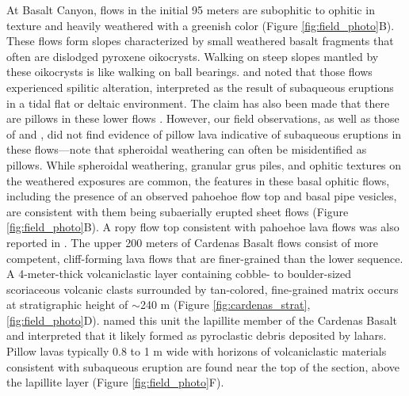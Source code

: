 \documentclass[draft]{agujournal2019}
\begin{document}
At Basalt Canyon, flows in the initial 95 meters are subophitic to ophitic in texture and heavily weathered with a greenish color (Figure \ref{fig:field_photo}B). These flows form slopes characterized by small weathered basalt fragments that often are dislodged pyroxene oikocrysts. Walking on steep slopes mantled by these oikocrysts is like walking on ball bearings.  and  noted that those flows experienced spilitic alteration, interpreted as the result of subaqueous eruptions in a tidal flat or deltaic environment. The claim has also been made that there are pillows in these lower flows \cite{Stevenson1982a, Hendricks1974a}. However, our field observations, as well as those of  and , did not find evidence of pillow lava indicative of subaqueous eruptions in these flows---note that spheroidal weathering can often be misidentified as pillows. While spheroidal weathering, granular grus piles, and ophitic textures on the weathered exposures are common, the features in these basal ophitic flows, including the presence of an observed pahoehoe flow top and basal pipe vesicles, are consistent with them being subaerially erupted sheet flows (Figure \ref{fig:field_photo}B). A ropy flow top consistent with pahoehoe lava flows was also reported in . The upper 200 meters of Cardenas Basalt flows consist of more competent, cliff-forming lava flows that are finer-grained than the lower sequence. A 4-meter-thick volcaniclastic layer containing cobble- to boulder-sized scoriaceous volcanic clasts surrounded by tan-colored, fine-grained matrix occurs at stratigraphic height of $\sim$240 m (Figure \ref{fig:cardenas_strat}, \ref{fig:field_photo}D).  named this unit the lapillite member of the Cardenas Basalt and interpreted that it likely formed as pyroclastic debris deposited by lahars. Pillow lavas typically 0.8 to 1 m wide with horizons of volcaniclastic materials consistent with subaqueous eruption are found near the top of the section, above the lapillite layer (Figure \ref{fig:field_photo}F). 
\end{document}
